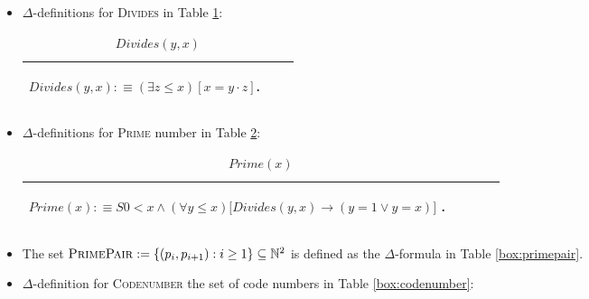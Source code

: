 \documentclass[11pt,letterpaper]{book}
\theoremstyle{definition}
\begin{document}
\begin{itemize}
\item{$\Delta$-definitions for \textsc{Divides} in Table \ref{box:divides}:

\begin{table}[h]
\caption{$Divides(y, x)$}
\label{box:divides}
\begin{tabular}{|p{0.9\linewidth}|}
\hline
\rule{0pt}{3ex}
\begin{center}
$ Divides(y, x) : \equiv (\exists z \leq x) [ x = y \cdot z ]$.
\end{center} \\
\hline
\end{tabular}
\end{table}

}
\item{$\Delta$-definitions for \textsc{Prime} number in Table \ref{box:prime}:

\begin{table}[ht!]
\caption{$Prime(x)$}
\label{box:prime}
\begin{tabular}{|p{0.9\linewidth}|}
\hline
\rule{0pt}{3ex}
\begin{center}
$ Prime(x) : \equiv S0 < x \land (\forall y \leq x) \big[ Divides(y,x) \rightarrow (y=1 \lor y = x) \big] $ .
\end{center} \\
\hline
\end{tabular}
\end{table}

}
\item{The set $ \text{\textsc{PrimePair}} := \{ (p_i , p_{i+1}) : i \geq 1 \} \subseteq \mathbb{N}^2  $ is defined as the $\Delta$-formula in Table \ref{box:primepair}.}
\item{$\Delta$-definition for \textsc{Codenumber} the set of code numbers in Table \ref{box:codenumber}:

}
\end{itemize}
\end{document}
